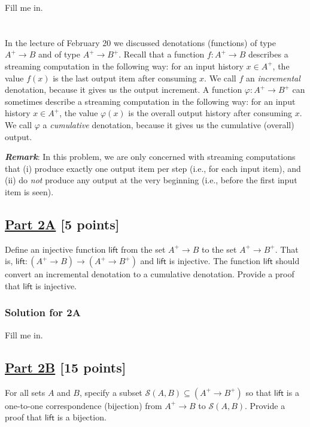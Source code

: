 \documentclass[11pt]{article}
\newcommand{\kplus}{^+}
\renewcommand{\phi}{\varphi}
\renewcommand{\S}{\mathcal{S}}
\newcommand{\lift}{\mathsf{lift}}
\begin{document}
Fill me in.

\clearpage %
\section*{}

In the lecture of February 20 we discussed denotations (functions) of type $A\kplus \to B$ and of type $A\kplus \to B\kplus$. Recall that a function $f: A\kplus \to B$ describes a streaming computation in the following way: for an input history $x \in A\kplus$, the value $f(x)$ is the last output item after consuming $x$. We call $f$ an \emph{incremental} denotation, because it gives us the output increment. A function $\phi: A\kplus \to B\kplus$ can sometimes describe a streaming computation in the following way: for an input history $x \in A\kplus$, the value $\phi(x)$ is the overall output history after consuming $x$. We call $\phi$ a \emph{cumulative} denotation, because it gives us the cumulative (overall) output.

\textbf{\em Remark}: In this problem, we are only concerned with streaming computations that (i) produce exactly one output item per step (i.e., for each input item), and (ii) do \emph{not} produce any output at the very beginning (i.e., before the first input item is seen).

\subsection*{\underline{Part 2A} [5 points]}

Define an injective function $\lift$ from the set $A\kplus \to B$ to the set $A\kplus \to B\kplus$. That is, $\lift: (A\kplus \to B) \to (A\kplus \to B\kplus)$ and $\lift$ is injective. The function $\lift$ should convert an incremental denotation to a cumulative denotation. Provide a proof that $\lift$ is injective.

\subsubsection*{Solution for 2A}

Fill me in.

\subsection*{{\underline{Part 2B} [15 points]}}

For all sets $A$ and $B$, specify a subset $\S(A,B) \subseteq (A\kplus \to B\kplus)$ so that $\lift$ is a one-to-one correspondence (bijection) from $A\kplus \to B$ to $\S(A,B)$. Provide a proof that $\lift$ is a bijection.
\end{document}

